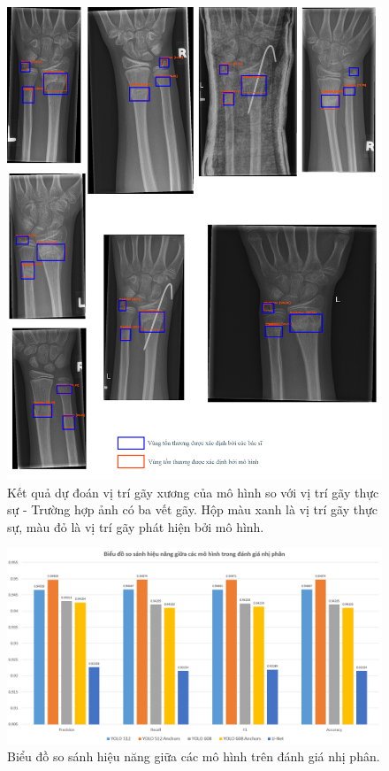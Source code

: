 \documentclass[../the.tex]{subfiles}
\begin{document}
\begin{figure}[H]
\centering
	\includegraphics[width=1\textwidth]{images/predict_3.png}
	\caption{Kết quả dự đoán vị trí gãy xương của mô hình so với vị trí gãy thực sự - Trường hợp ảnh có ba vết gãy. Hộp màu xanh là vị trí gãy thực sự, màu đỏ là vị trí gãy phát hiện bởi mô hình.}
	\label{fig:predict_3}
\end{figure}

\begin{figure}[ht!]
\centering
	\includegraphics[width=1\textwidth]{images/chart_1.PNG}
	\caption{Biểu đồ so sánh hiệu năng giữa các mô hình trên đánh giá nhị phân.}
	\label{fig:chart_1}
\end{figure}
\end{document}
